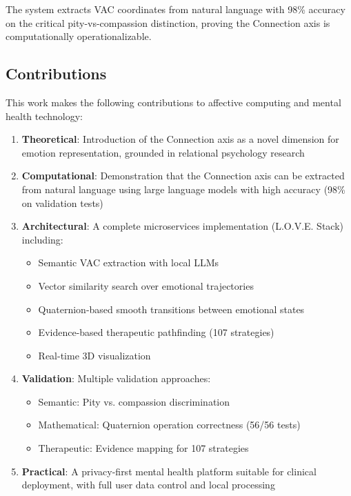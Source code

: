 \documentclass[10pt,twocolumn]{article}
\begin{document}
The system extracts VAC coordinates from natural language with 98\% accuracy on the critical pity-vs-compassion distinction, proving the Connection axis is computationally operationalizable.

\subsection{Contributions}

This work makes the following contributions to affective computing and mental health technology:

\begin{enumerate}
    \item \textbf{Theoretical}: Introduction of the Connection axis as a novel dimension for emotion representation, grounded in relational psychology research

    \item \textbf{Computational}: Demonstration that the Connection axis can be extracted from natural language using large language models with high accuracy (98\% on validation tests)

    \item \textbf{Architectural}: A complete microservices implementation (L.O.V.E. Stack) including:
    \begin{itemize}
        \item Semantic VAC extraction with local LLMs
        \item Vector similarity search over emotional trajectories
        \item Quaternion-based smooth transitions between emotional states
        \item Evidence-based therapeutic pathfinding (107 strategies)
        \item Real-time 3D visualization
    \end{itemize}

    \item \textbf{Validation}: Multiple validation approaches:
    \begin{itemize}
        \item Semantic: Pity vs. compassion discrimination
        \item Mathematical: Quaternion operation correctness (56/56 tests)
        \item Therapeutic: Evidence mapping for 107 strategies
    \end{itemize}

    \item \textbf{Practical}: A privacy-first mental health platform suitable for clinical deployment, with full user data control and local processing
\end{enumerate}
\end{document}
